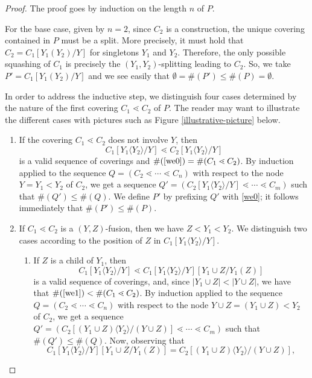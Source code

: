 \documentclass{article}
\theoremstyle{plain}
\theoremstyle{definition}
\begin{document}
\begin{proof}
 The proof goes by induction on the length $n$ of $P$. 

\smallskip

For the base case, given by $n=2$, since
 $C_2$ is a construction, the unique covering contained in $P$ must be a split. More precisely, it must hold that $C_2=C_1[Y_1(Y_2)/Y]$ for singletons $Y_1$ and $Y_2$. Therefore, the only possible squashing of $C_1$ is precisely the $(Y_1,Y_2)$-splitting leading to $C_2$. So, we take $P'=C_1[Y_1(Y_2)/Y]$ and we see easily that $\emptyset= \#(P')\leq \#(P)=\emptyset$.

\smallskip

In order to address the inductive step, we distinguish four cases determined by the nature of the first covering $C_1\lessdot C_2$ of $P$.
The reader may want to illustrate the different cases with pictures such as Figure \ref{illustrative-picture} below.
\begin{enumerate}
\item If the covering $C_1\lessdot C_2$ does not involve $Y$, then 
\begin{equation}C_1[Y_1\langle Y_2 \rangle /Y]\lessdot C_2[Y_1\langle Y_2\rangle /Y]\label{we0}\end{equation} is a valid sequence of coverings and $\#(\eqref{we0})=\#(C_1\lessdot C_2)$. By induction applied to the sequence $Q=(C_2\lessdot \cdots \lessdot C_n)$ with respect to the node $Y=Y_1<Y_2$ of $C_2$, we get a sequence $Q'=(C_2[Y_1\langle Y_2 \rangle /Y]\lessdot \cdots \lessdot C_m)$ such that $\#(Q')\leq\#(Q)$. We define $P'$ by prefixing $Q'$ with \eqref{we0}; it follows immediately that $\#(P')\leq\#(P)$.
\item If $C_1\lessdot C_2$ is a $(Y,Z)$-fusion, then we have $Z<Y_1<Y_2$. We distinguish two cases according to the position of $Z$ in $C_1[Y_1\langle Y_2 \rangle /Y]$.
\begin{enumerate}
\item If $Z$ is a child of $Y_1$, then \begin{equation} 
C_1[Y_1\langle Y_2 \rangle /Y]\lessdot C_1[Y_1\langle Y_2 \rangle /Y][Y_1\cup Z/Y_1(Z)] 
\label{we1}\end{equation}
is a valid sequence of coverings, and, since $|Y_1\cup Z|<|Y\cup Z|$, we have that $\#(\eqref{we1})<\#(C_1\lessdot C_2)$.
 By induction applied to the sequence $Q=(C_2\lessdot \cdots \lessdot C_n)$ with respect to the node $Y\cup Z=(Y_1\cup Z)<Y_2$ of $C_2$, we get a sequence $Q'=(C_2[(Y_1\cup Z)\langle Y_2\rangle/(Y\cup Z)]\lessdot \cdots \lessdot C_m)$ such that $\#(Q')\leq\#(Q)$. Now, observing that $$C_1[Y_1\langle Y_2 \rangle /Y][Y_1\cup Z/Y_1(Z)]=C_2[(Y_1\cup Z)\langle Y_2\rangle/(Y\cup Z)],$$


\end{enumerate}
\end{enumerate}
\end{proof}
\end{document}
